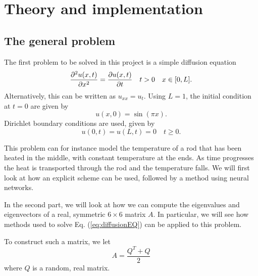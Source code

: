 \section{Theory and implementation}
\label{sec:theory}

\subsection{The general problem}

The first problem to be solved in this project is a simple diffusion equation
\begin{equation}
\pdv[2]{u(x,t)}{x} = \pdv{u(x,t)}{t} \quad t>0 \quad x\in [0,L].
    \label{eq:diffusionEQ}
\end{equation}
Alternatively, this can be written as $u_{xx} = u_t$. Using $L=1$, the initial condition at $t=0$ are given by
\begin{equation}
    u(x,0) = \sin(\pi x)
    \label{eq:initialCondition}.
\end{equation}
Dirichlet boundary conditions are used, given by
\begin{equation*}
    u(0,t) = u(L,t) = 0 \quad t \geq 0.
\end{equation*}

This problem can for instance model the temperature of a rod that has been heated in the middle, with constant temperature at the ends.
As time progresses the heat is transported through the rod and the temperature falls. We will first look at how an explicit scheme can be used, followed by a method using neural networks.

In the second part, we will look at how we can compute the eigenvalues and eigenvectors of a real, symmetric $6\times 6$ matrix $A$. In particular, we will see how methods used to solve Eq. (\ref{eq:diffusionEQ}) can be applied to this problem.

To construct such a matrix, we let
\begin{equation*}
	A = \frac{Q^T+Q }{2}
\end{equation*}
where $Q$ is a random, real matrix.

